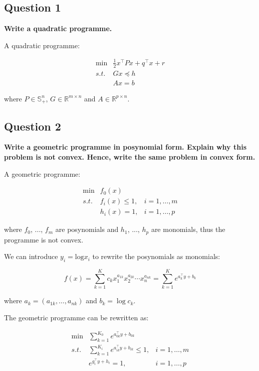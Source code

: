 
\subsection*{Question 1}
\textbf{Write a quadratic programme.}

A quadratic programme: 

$$
\begin{array}{ll}
\min & \frac{1}{2}x^\top P x + q^\top x + r \\
s.t. & G x \preccurlyeq h\\
& Ax = b
\end{array}
$$

where $P\in\mathbb{S}_+^n$, $G \in \mathbb{R}^{m\times n}$ and $A \in \mathbb{R}^{p\times n}$. 

\subsection*{Question 2}
\textbf{Write a geometric programme in posynomial form. Explain why this problem is not convex. Hence, write the same problem in convex form.}

A geometric programme: 

$$
\begin{array}{lll}
\min & f_0(x) &\\
s.t. & f_i(x) \le 1, & i = 1,\dots,m\\
& h_i(x) = 1,  & i = 1,\dots,p
\end{array}
$$

where $f_0$, ..., $f_m$ are posynomials and $h_1$, ..., $h_p$ are monomials, thus the programme is not convex. 

We can introduce $y_i = \text{log} x_i$ to rewrite the posynomials as monomials:

$$
\displaystyle f(x) = \sum_{k=1}^K c_k x_1^{a_{1k}}x_2^{a_{2k}}\cdots x_n^{a_{nk}} = \sum_{k=1}^K e^{a_k^\top y + b_k}
$$

where $a_k = (a_{1k},\dots,a_{nk})$ and $b_k = \log c_k$. 

The geometric programme can be rewritten as:

$$
\begin{array}{lll}
\min & \sum_{k=1}^{K_0} e^{a_{0k}^\top y + b_{0k}} &\\
s.t. & \sum_{k=1}^{K_i} e^{a_{ik}^\top y + b_{ik}} \le 1, & i = 1,\dots,m\\
& e^{g_i^\top y + h_i} = 1,  & i = 1,\dots,p
\end{array}
$$

